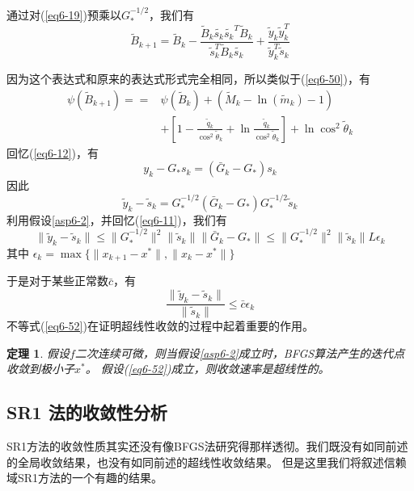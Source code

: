 \documentclass{article}
\newtheorem{thm}{定理}
\begin{document}
通过对(\ref{eq6-19})预乘以$G_*^{-1/2}$，我们有
\[
  \tilde{B}_{k+1} = \tilde{B}_k - \frac{\tilde{B}_k \tilde{s_k} \tilde{s_k}^T\tilde{B}_k}{\tilde{s}_k^T\tilde{B}_k \tilde{s_k}}
  + \frac{\tilde{y}_k\tilde{y}_k^T}{\tilde{y}_k^T\tilde{s}_k}
\]

因为这个表达式和原来的表达式形式完全相同，所以类似于(\ref{eq6-50})，有
\begin{equation}
  \label{eq6-53}
  \begin{split}
    \psi(\tilde{B}_{k+1}) =
    = & \psi(\tilde{B}_k) + (\tilde{M}_k - \ln(\tilde{m}_k) - 1)\\
    & + \left[1 - \frac{\tilde{q}_k}{\cos^2\tilde{\theta}_k} + \ln\frac{\tilde{q}_k}{\cos^2\tilde{\theta}_k}\right] + \ln \cos^2\tilde{\theta}_k
  \end{split}
\end{equation}
回忆(\ref{eq6-12})，有
\[
  y_k - G_*s_k = (\bar{G}_k - G_*)s_k
\]
因此
\[
  \tilde{y}_k - \tilde{s}_k = G_*^{-1/2}(\bar{G}_k - G_*)G_*^{-1/2}\tilde{s}_k
\]
利用假设\ref{asp6-2}，并回忆(\ref{eq6-11})，我们有
\[
  \|\tilde{y}_k - \tilde{s}_k\| \le \|G_*^{-1/2}\|^2 \|\tilde{s}_k\| \|\bar{G}_k - G_*\|
  \le \|G^{-1/2}_*\|^2 \|\tilde{s}_k\| L \epsilon_k
\]
其中 $\epsilon_k = \max\{\|x_{k+1}-x^*\|,\|x_k - x^*\|\}$

于是对于某些正常数$\bar{c}$，有
\begin{equation}
  \label{eq6-54}
  \frac{\|\tilde{y}_k - \tilde{s}_k\|}{\|\tilde{s}_k\|} \le \bar{c}\epsilon_k
\end{equation}
不等式(\ref{eq6-52})在证明超线性收敛的过程中起着重要的作用。

\begin{thm}
  \label{thm6-6}
  假设$f$二次连续可微，则当假设\ref{asp6-2}成立时，BFGS算法产生的迭代点收敛到极小子$x^*$。
  假设(\ref{eq6-52})成立，则收敛速率是超线性的。
\end{thm}

\subsection{SR1 法的收敛性分析}
SR1方法的收敛性质其实还没有像BFGS法研究得那样透彻。我们既没有如同前述的全局收敛结果，也没有如同前述的超线性收敛结果。
但是这里我们将叙述信赖域SR1方法的一个有趣的结果。
\end{document}
